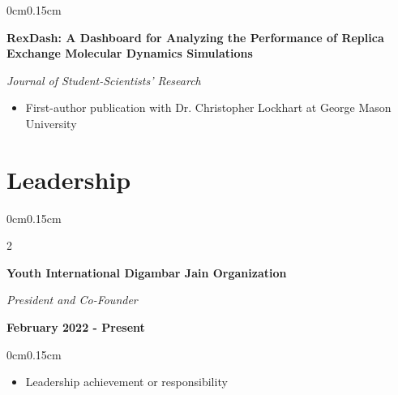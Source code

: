 \documentclass[10pt, letterpaper]{article}
\newenvironment{highlights}{
    \begin{itemize}[topsep=0pt, parsep=0pt, partopsep=0pt, itemsep=0pt, leftmargin=0.6cm]
}{
    \end{itemize}
}
\newenvironment{onecolentry}{
    \begin{adjustwidth}{0cm}{0.15cm}
}{
    \end{adjustwidth}
}
\newenvironment{twocolentry}[2][]{
    \onecolentry
    \def\secondColumn{#2}
    \setcolumnwidth{\fill, 4cm}
    \begin{paracol}{2}
}{
    \switchcolumn \raggedleft \secondColumn
    \end{paracol}
    \endonecolentry
}
\begin{document}
    \vspace{0.05cm}

    \begin{onecolentry}
        \textbf{RexDash: A Dashboard for Analyzing the Performance of Replica Exchange Molecular Dynamics Simulations}
        
        \textit{Journal of Student-Scientists' Research}
        \begin{highlights}
            \item First-author publication with Dr. Christopher Lockhart at George Mason University
        \end{highlights}
    \end{onecolentry}

    \vspace{0.1cm}

    \section{Leadership}
    \vspace{0.1cm}

    \begin{twocolentry}{\textbf{February 2022 - Present}}
        \textbf{Youth International Digambar Jain Organization}
        
        \textit{President and Co-Founder}
    \end{twocolentry}
    \vspace{-0.15cm}
    \begin{onecolentry}
        \begin{highlights}
            \item Leadership achievement or responsibility
        \end{highlights}
    \end{onecolentry}
\end{document}
